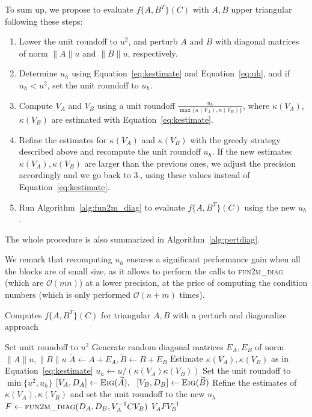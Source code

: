 \documentclass{siamart1116}
\renewcommand{\tilde}{\widetilde}
\newcommand{\norm}[1]{\lVert#1\rVert}
\begin{document}
To sum up, we propose to evaluate $f\{A,B^T\}(C)$ with $A,B$ upper
triangular following these steps:
\begin{enumerate}
    \item Lower the unit roundoff to $u^2$, and perturb $A$ and $B$
      with diagonal matrices of norm $\norm{A} u$ and $\norm{B} u$, 
      respectively.
    \item Determine $u_h$ using Equation~\ref{eq:kestimate} and Equation~\ref{eq:uh}, and if 
      $u_h < u^2$, set the unit roundoff to $u_h$.
      \item Compute $V_A$ and $V_B$ using a unit roundoff $\frac{u_h}{\max\{\kappa(V_A),\kappa(V_B)\}}$, where $\kappa(V_A)$, $\kappa(V_B)$ are estimated with Equation~\ref{eq:kestimate}.
	  \item Refine the estimates for $\kappa(V_A)$ 
		  and $\kappa(V_B)$ with the  greedy strategy described
		  above and recompute the unit roundoff $u_h$. If the new estimates $\kappa(V_A),\kappa(V_B)$ are larger than the previous ones, we adjust the precision accordingly and we go back to 3., using these values instead of Equation~\ref{eq:kestimate}.  
    \item Run Algorithm~\ref{alg:fun2m_diag} to evaluate 
      $f\{A, B^T\}(C)$ using the new $u_h$. 
\end{enumerate}
The whole procedure is also summarized in Algorithm~\ref{alg:pertdiag}.

We remark that recomputing $u_h$ ensures a significant performance gain when 
all the blocks are of small size, as it allows 
to perform the calls to \textsc{fun2m\_diag} 
(which are $\mathcal O(mn)$) at a lower precision, at the price
of computing the condition numbers (which is only performed 
$\mathcal O(n + m)$ times).


 

\begin{algorithm} 
  	\small 
  	\caption{Computes $f\{A,B^T\}(C)$ for triangular $A,B$ with a 
  	perturb and diagonalize approach}\label{alg:pertdiag}
  	\begin{algorithmic}[1]
  		\State Set unit roundoff to $u^2$
  		\State Generate random diagonal matrices $E_A, E_B$ of norm
  		  $\norm{A}u, \norm{B}u$
  		\State $\tilde A \gets A + E_A, \tilde B \gets B + E_B$
  		\State Estimate $\kappa(V_A), \kappa(V_B)$ as in Equation~\ref{eq:kestimate}
  		\State $u_h \gets u / (\kappa(V_A) \kappa(V_B))$
  		\State Set the unit roundoff to $\min\{ u^2, u_h \}$
  		\State $[V_A, D_A] \gets \Call{Eig}{\tilde A}, \ \
  		  [V_B, D_B] \gets \Call{Eig}{\tilde B}$
  		  \State Refine the estimates of $\kappa(V_A),\kappa(V_B)$ and set the unit roundoff to the new $u_h$
  		\State $F \gets \Call{fun2m\_diag}{D_A, D_B, V_A^{-1} C V_B}$
  		\State \Return $V_A F V_B^{-1}$
  		\EndProcedure
  	\end{algorithmic}
  \end{algorithm} 
  
\end{document}
